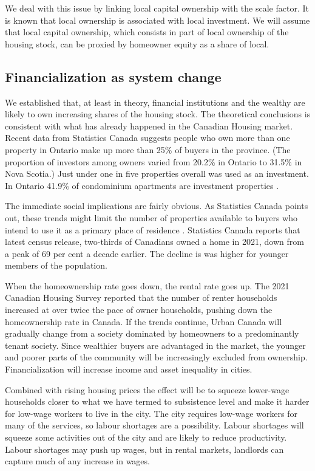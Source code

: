 We deal with this issue by linking local capital ownership with the scale factor. It is known that local ownership is associated with local investment. We will assume that local capital ownership, which consists in part of local ownership of the housing stock, can be proxied by homeowner equity as a share of local. 

\subsection{Financialization as system change} \label{section-system}
We established that, at least in theory, financial institutions and the wealthy are likely to own increasing shares of the housing stock. The theoretical conclusions is consistent with what has already happened in the Canadian Housing market. Recent data from Statistics Canada \cite{fontaineResidentialRealEstate2023} suggests people who own more than one property in Ontario make up more than 25\% of buyers in the province. (The proportion of investors among owners varied from 20.2\% in Ontario to 31.5\% in Nova Scotia.)
Just under one in five properties overall was used as an investment.
In Ontario 41.9\% of condominium apartments are investment properties \cite{statisticscanadaBuyRentHousing2022}.

The immediate social implications are fairly obvious. As Statistics Canada points out, these trends might limit the number of properties available to buyers who intend to use it as a primary place of residence  \cite{fontaineResidentialRealEstate2023}. Statistics Canada reports that latest census release, two-thirds of Canadians owned a home in 2021, down from a peak of 69 per cent a decade earlier. The decline is was higher for younger members of the population. 

When the homeownership rate goes down, the rental rate goes up. The 2021 Canadian Housing Survey reported that the number of renter households increased  at over twice the pace of owner households, pushing down the homeownership rate in Canada. If the trends continue, Urban Canada will gradually change from a society dominated by homeowners to a predominantly tenant society. Since wealthier buyers are advantaged in the market, the younger and poorer parts of the community will be increasingly excluded from ownership. Financialization will increase income and asset inequality in cities.

Combined with rising housing prices the effect will be to squeeze lower-wage households closer to what we have termed to subsistence level and make it harder for low-wage workers to live in the city. The city requires low-wage workers for many of the services, so labour shortages are a possibility. Labour shortages will squeeze some activities out of the city and are likely to reduce productivity. Labour shortages may push up wages, but in rental markets, landlords can capture much of any increase in wages. 

